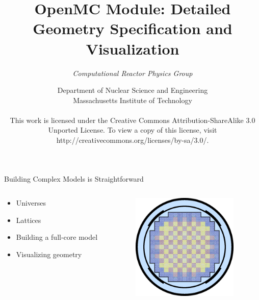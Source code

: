 \documentclass[serif]{beamer}
\title{OpenMC Module: Detailed Geometry Specification and Visualization}
\author{\emph{Computational Reactor Physics Group}}
\date{\normalsize Department of Nuclear Science and Engineering\\
                  Massachusetts Institute of Technology \\
~\\
\tiny{This work is licensed under the Creative Commons Attribution-ShareAlike 3.0 Unported License. To view a copy of this license, visit http://creativecommons.org/licenses/by-sa/3.0/.}}
\begin{document}

\frame{\titlepage}\logo{} %



\begin{frame}{Building Complex Models is Straightforward}
  \begin{columns}
    \begin{column}{0.5\linewidth}
      \begin{itemize}
        \item Universes
        \item Lattices
        \item Building a full-core model
        \item Visualizing geometry
      \end{itemize}
    \end{column}
    \begin{column}{0.5\linewidth}
      \centering
      \includegraphics[width=2in]{src/core.png}      
    \end{column}
  \end{columns}
\end{frame}













\end{document}
